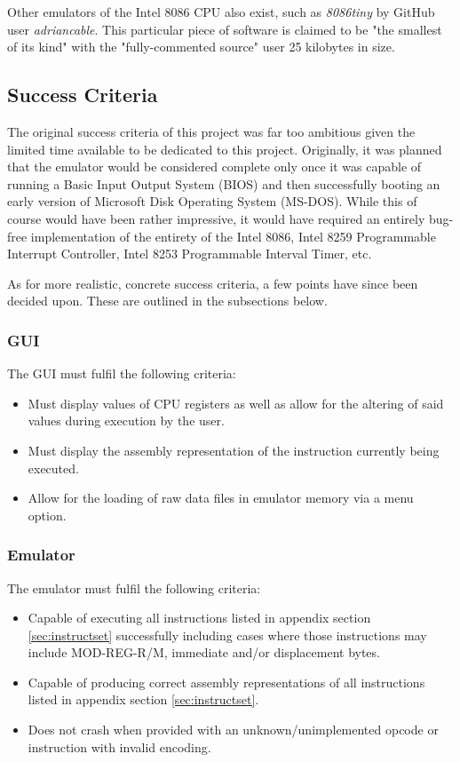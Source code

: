         Other emulators of the Intel 8086 CPU also exist, such as \textit{8086tiny} by GitHub user \textit{adriancable}. This particular piece of software is claimed to be "the smallest of its kind" with the "fully-commented source" user 25 kilobytes in size.

\subsection{Success Criteria}
    The original success criteria of this project was far too ambitious given the limited time available to be dedicated to this project. Originally, it was planned that the emulator would be considered complete only once it was capable of running a Basic Input Output System (BIOS) and then successfully booting an early version of Microsoft Disk Operating System (MS-DOS). While this of course would have been rather impressive, it would have required an entirely bug-free implementation of the entirety of the Intel 8086, Intel 8259 Programmable Interrupt Controller, Intel 8253 Programmable Interval Timer, etc.

    As for more realistic, concrete success criteria, a few points have since been decided upon. These are outlined in the subsections below.

    \subsubsection{GUI}
        The GUI must fulfil the following criteria:
        \begin{itemize}
            \item Must display values of CPU registers as well as allow for the altering of said values during execution by the user.
            \item Must display the assembly representation of the instruction currently being executed.
            \item Allow for the loading of raw data files in emulator memory via a menu option.
        \end{itemize}

    \subsubsection{Emulator}
        The emulator must fulfil the following criteria:
        \begin{itemize}
            \item Capable of executing all instructions listed in appendix section \ref{sec:instructset} successfully including cases where those instructions may include MOD-REG-R/M, immediate and/or displacement bytes.
            \item Capable of producing correct assembly representations of all instructions listed in appendix section \ref{sec:instructset}.
            \item Does not crash when provided with an unknown/unimplemented opcode or instruction with invalid encoding.
        \end{itemize}
